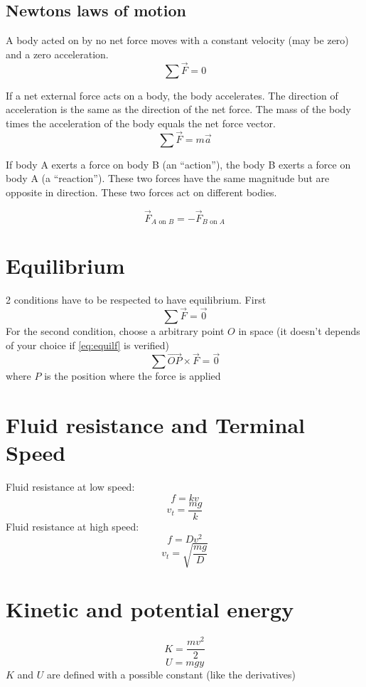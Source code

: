 \documentclass[a4paper,10pt]{article}
\begin{document}
\subsection{Newtons laws of motion}

A body acted on by no net force moves with a constant velocity (may be zero) and a zero acceleration.
\[ \sum \vec{F} = 0 \]

If a net external force acts on a body, the body accelerates. The direction of acceleration is the same as the direction of the net force. The mass of the body times the acceleration of the body equals the net force vector.
\[ \sum \vec{F} = m \vec{a} \]

If body A exerts a force on body B (an ``action''), the body B exerts a force on body A (a ``reaction''). These two forces have the same magnitude but are opposite in direction. These two forces act on different bodies. 

\[ \vec{F}_{A\textrm{ on }B} = -\vec{F}_{B\textrm{ on }A} \]

\section{Equilibrium}
2 conditions have to be respected to have equilibrium. First
\begin{equation}\label{eq:equilf}
	\sum \vec{F} = \vec{0}
\end{equation}
For the second condition, choose a arbitrary point $O$ in space
(it doesn't depends of your choice if \eqref{eq:equilf} is verified)
$$\sum \vec{OP} \times \vec{F} = \vec{0}$$
where $P$ is the position where the force is applied

\section{Fluid resistance and Terminal Speed}
Fluid resistance at low speed:
\[ f = kv \]
\[ v_t = \frac{mg}{k} \]
Fluid resistance at high speed:
\[ f = Dv^2 \]
\[ v_t = \sqrt{ \frac{mg}{D} }\]

\section{Kinetic and potential energy}
\[K = \frac{mv^2}{2}\]
\[U = mgy\]
$K$ and $U$ are defined with a possible constant (like the derivatives)
\end{document}
